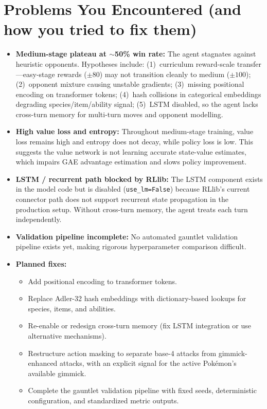\documentclass[11pt, a4paper]{article}
\begin{document}
\section{Problems You Encountered (and how you tried to fix them)}
\begin{itemize}
    \item \textbf{Medium-stage plateau at $\sim$50\% win rate:}
        The agent stagnates against heuristic opponents. Hypotheses include: (1)~curriculum reward-scale transfer---easy-stage rewards ($\pm80$) may not transition cleanly to medium ($\pm100$); (2)~opponent mixture causing unstable gradients; (3)~missing positional encoding on transformer tokens; (4)~hash collisions in categorical embeddings degrading species/item/ability signal; (5)~LSTM disabled, so the agent lacks cross-turn memory for multi-turn moves and opponent modelling.

    \item \textbf{High value loss and entropy:}
        Throughout medium-stage training, value loss remains high and entropy does not decay, while policy loss is low. This suggests the value network is not learning accurate state-value estimates, which impairs GAE advantage estimation and slows policy improvement.

    \item \textbf{LSTM / recurrent path blocked by RLlib:}
        The LSTM component exists in the model code but is disabled (\texttt{use\_lm=False}) because RLlib's current connector path does not support recurrent state propagation in the production setup. Without cross-turn memory, the agent treats each turn independently.

    \item \textbf{Validation pipeline incomplete:}
        No automated gauntlet validation pipeline exists yet, making rigorous hyperparameter comparison difficult.

    \item \textbf{Planned fixes:}
        \begin{itemize}
            \item Add positional encoding to transformer tokens.
            \item Replace Adler-32 hash embeddings with dictionary-based lookups for species, items, and abilities.
            \item Re-enable or redesign cross-turn memory (fix LSTM integration or use alternative mechanisms).
            \item Restructure action masking to separate base-4 attacks from gimmick-enhanced attacks, with an explicit signal for the active Pok\'{e}mon's available gimmick.
            \item Complete the gauntlet validation pipeline with fixed seeds, deterministic configuration, and standardized metric outputs.
        \end{itemize}
\end{itemize}
\end{document}
